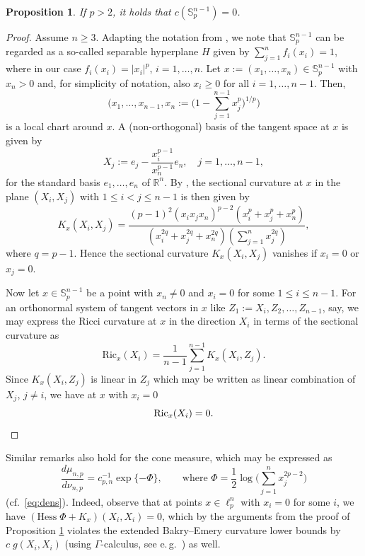 \documentclass[a4paper,12pt]{amsart}
\numberwithin{equation}{section}
\newtheorem{proposition}[satz]{Proposition}
\theoremstyle{remark}
\def\R{{\mathbb R}}
\def\S{{\mathbb S}}
\begin{document}
\begin{proposition}\label{prop:Ric}
If $p > 2$, it holds that $c(\S_p^{n-1})=0$.
\end{proposition}

\begin{proof}
Assume $n\ge 3$. Adapting the notation from \cite{ALV23}, we note that $\S_p^{n-1}$ can be regarded as a so-called separable hyperplane $H$ given by $ \sum_{j=1}^n f_i(x_i) = 1$, where in our case $f_i (x_i) = |x_i|^p$, $i=1,\ldots, n$. Let $x:=(x_1, \ldots, x_n)\in \S_p^{n-1}$ with $ x_n >0 $ and, for simplicity of notation, also $x_i \ge 0$ for all $i = 1, \ldots,n-1$. Then,
\[
\Big(x_1, \ldots, x_{n-1}, x_n:=\Big( 1- \sum_{j=1}^{n-1} x_j^p \Big)^{1/p}\Big)
\]
is a local chart around $x$. A (non-orthogonal) basis of the tangent space at $x$ is given by
\[
X_j:=e_j- \frac{x_i^{p-1}}{x_n^{p-1} } e_n,\quad j=1, \ldots, n-1,
\]
for the standard basis $e_1,\ldots,e_n$ of $\R^n$. By \cite[Eq.\ (4)]{ALV23}, the sectional curvature at $x$ in the plane $(X_i,X_j)$ with $1\le i< j\le n-1$ is then given by
\[
K_x(X_i, X_j) = \frac{ (p-1)^2 (x_i x_j x_n)^{p-2} (x_i^p + x_j^p + x_n^p)} {(x_i^{2 q} + x_j^{2 q} + 
   x_n^{2 q}) (\sum_{j=1}^n x_j^{2q})},
   \]
where $q=p-1$. Hence the sectional curvature $K_x(X_i, X_j)$ vanishes if $x_i=0$ or $x_j=0$.

Now let $x \in \S_p^{n-1}$ be a point with $x_n \ne 0$ and $x_i=0$ for some $1\le i \le n-1$. For an orthonormal system of tangent vectors in $x$ like $Z_1:=X_i, Z_2,\ldots, Z_{n-1}$, say, we may express the Ricci curvature at $x$ in the direction $X_i$ in terms of the sectional curvature as
\[ \mathrm{Ric}_x(X_i) = \frac{1}{n - 1}\sum_{j = 1}^{n - 1} K_x(X_i, Z_j). \]
Since $K_x(X_i, Z_j)$ is linear in $Z_j$ which may be written as linear combination of $X_j$, $j \ne i$, we have at $x$ with $x_i=0$ 
\[  \mathrm{Ric}_x(X_i) =0.\qedhere \]
\end{proof}

Similar remarks also hold for the cone measure, which may be expressed as
\[
\frac {d\mu_{n,p}}{d\nu_{n,p}}= c_{p,n}^{-1} \exp\{ -\Phi\}, \qquad \text{where } \Phi= \frac 1 2\log\Big( \sum_{j=1}^n x_j^{2p-2}\Big)
\]
(cf.\ \eqref{eq:dens}). Indeed, observe that at points $x\in \ell_p^n$ with $x_i=0$ for some $i$, we have $(\mathrm{Hess}\;\Phi+ K_x)(X_i,X_i) =0$, which by the arguments from the proof of Proposition \ref{prop:Ric} violates the extended Bakry--Emery curvature lower bounds by $c\; g(X_i,X_i)$ (using $\Gamma$-calculus, see e.\,g.\ \cite[Cor.\ 4.4.24]{AGZ10}) as well.
\end{document}
